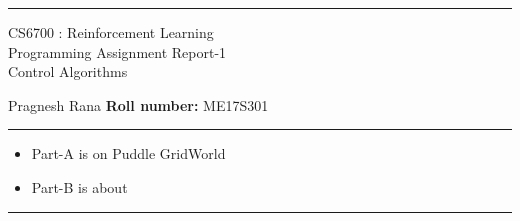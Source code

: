 \documentclass[addpoints,12pt,solution]{exam}
\begin{document}
\hrule
\vspace{1mm}
\noindent 
\begin{center}
{\Large CS6700 : Reinforcement Learning} \\

{\large Programming Assignment Report-1} \\
{\large Control Algorithms   \hfill }
\end{center}
\vspace{1mm}
\noindent 



 Pragnesh Rana \hfill {\bf Roll number:} ME17S301
\vspace{2mm}
\hrule

{\small

\begin{itemize}\itemsep0mm
\item Part-A is on Puddle GridWorld
\item Part-B is about 
\end{itemize}
}

\hrule

\vspace{3mm}





\newpage



		
\end{document}
